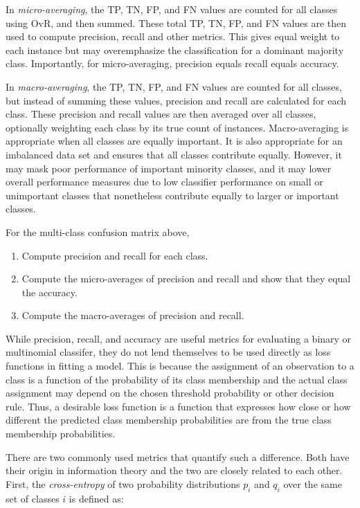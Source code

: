 In \emph{micro-averaging}, the TP, TN, FP, and FN values are counted for all classes using OvR, and then summed. These total TP, TN, FP, and FN values are then used to compute precision, recall and other metrics. This gives equal weight to each instance but may overemphasize the classification for a dominant majority class. Importantly, for micro-averaging, precision equals recall equals accuracy.

In \emph{macro-averaging}, the TP, TN, FP, and FN values are counted for all classes, but instead of summing these values, precision and recall are calculated for each class. These precision and recall values are then averaged over all classes, optionally weighting each class by its true count of instances. Macro-averaging is appropriate when all classes are equally important. It is also appropriate for an imbalanced data set and ensures that all classes contribute equally. However, it may mask poor performance of important minority classes, and it may lower overall performance measures due to low classifier performance on small or unimportant classes that nonetheless contribute equally to larger or important classes. 

\begin{exercisebox}
For the multi-class confusion matrix above,
\begin{enumerate}
  \item Compute precision and recall for each class.
  \item Compute the micro-averages of precision and recall and show that they equal the accuracy.
  \item Compute the macro-averages of precision and recall.
\end{enumerate}
\end{exercisebox}

While precision, recall, and accuracy are useful metrics for evaluating a binary or multinomial classifer, they do not lend themselves to be used directly as loss functions in fitting a model. This is because the assignment of an observation to a class is a function of the probability of its class membership and the actual class assignment may depend on the chosen threshold probability or other decision rule. Thus, a desirable loss function is a function that expresses how close or how different the predicted class membership probabilities are from the true class membership probabilities. 

There are two commonly used metrics that quantify such a difference. Both have their origin in information theory and the two are closely related to each other. First, the \emph{cross-entropy} of two probability distributions $p_i$ and $q_i$ over the same set of classes $i$ is defined as:


